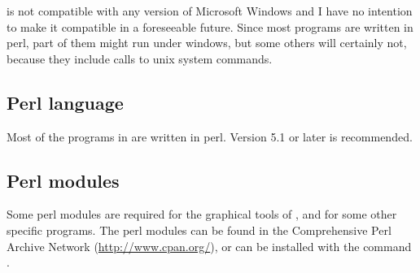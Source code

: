 \documentclass[12pt,a4paper, oneside]{scrreprt} %
\begin{document}
\RSAT is not compatible with any version of Microsoft Windows and I
have no intention to make it compatible in a foreseeable future. Since
most programs are written in perl, part of them might run under
windows, but some others will certainly not, because they include
calls to unix system commands.

\subsection{Perl language}

Most of the programs in \RSAT are written in perl. Version 5.1 or
later is recommended.

\subsection{Perl modules}

Some perl modules are required for the graphical tools of \RSAT, and
for some other specific programs. The perl modules can be found in the
Comprehensive Perl Archive Network (\url{http://www.cpan.org/}), or
can be installed with the command .
\end{document}
